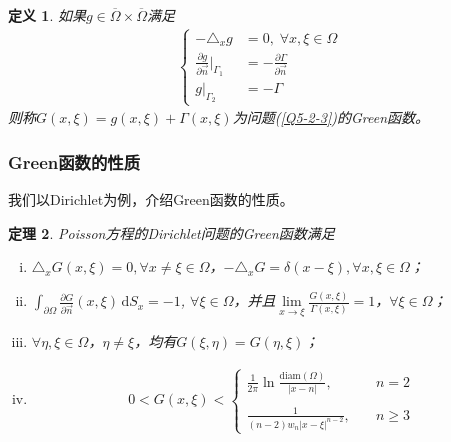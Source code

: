 \documentclass[11pt, a4paper]{article}
\theoremstyle{theorem}
\newtheorem{thm}{定理}[section]
\newtheorem{definition}[thm]{定义}
\newcommand{\intd}[1]{\,\mathrm{d}{#1}}
\begin{document}
\begin{definition}
    如果$g \in \overline{\Omega} \times \overline{\Omega}$满足
    \begin{align}
        \begin{cases}
            - \triangle_x g &= 0, \; \forall x,\xi \in \Omega \\
            \frac{\partial g}{\partial \vec{n}} \bigg|_{\Gamma_1} &= - \frac{\partial \Gamma}{\partial \vec{n}} \\
            g \bigg|_{\Gamma_2} &= - \Gamma
        \end{cases}
    \end{align}
    则称$G(x,\xi) = g(x,\xi) + \Gamma(x,\xi)$为问题(\ref{Q5-2-3})的Green函数。
\end{definition}

\subsubsection{Green函数的性质}

我们以Dirichlet为例，介绍Green函数的性质。

\begin{thm}
    Poisson方程的Dirichlet问题的Green函数满足
    \begin{enumerate}[(i)]
        \item $\triangle_x G(x, \xi) = 0, \forall x \neq \xi \in \Omega$，$- \triangle_x G = \delta(x-\xi), \forall x,\xi \in \Omega$；
        \item $\int_{\partial \Omega} \frac{\partial G}{\partial \vec{n}}(x,\xi) \intd S_x = -1$, $\forall \xi \in \Omega$，并且$\lim\limits_{x \rightarrow \xi} \frac{G(x,\xi)}{\Gamma(x,\xi)} = 1$，$\forall \xi \in \Omega$；
        \item $\forall \eta, \xi \in \Omega$，$\eta \neq \xi$，均有$G(\xi,\eta) = G(\eta,\xi)$；
        \item
        \begin{align}
            0 < G(x,\xi) <
            \begin{cases}
            \displaystyle\frac{1}{2\pi} \ln \frac{\text{diam}(\Omega)}{|x - n|}, \quad &n = 2 \\
            \\
            \displaystyle\frac{1}{(n-2) w_n|x - \xi|^{n-2}}, \quad &n \geq 3
            \end{cases}
        \end{align}
    \end{enumerate}
\end{thm}
\end{document}
